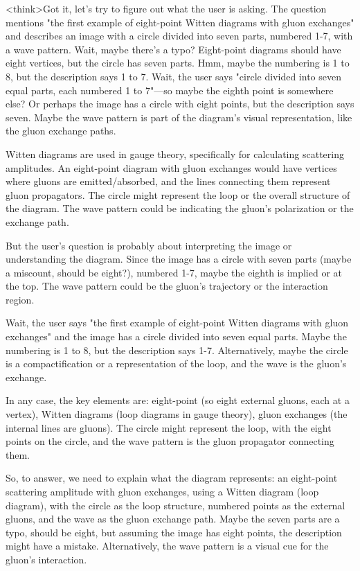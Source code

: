 <think>Got it, let's try to figure out what the user is asking. The question mentions "the first example of eight-point Witten diagrams with gluon exchanges" and describes an image with a circle divided into seven parts, numbered 1-7, with a wave pattern. Wait, maybe there's a typo? Eight-point diagrams should have eight vertices, but the circle has seven parts. Hmm, maybe the numbering is 1 to 8, but the description says 1 to 7. Wait, the user says "circle divided into seven equal parts, each numbered 1 to 7"—so maybe the eighth point is somewhere else? Or perhaps the image has a circle with eight points, but the description says seven. Maybe the wave pattern is part of the diagram's visual representation, like the gluon exchange paths.

Witten diagrams are used in gauge theory, specifically for calculating scattering amplitudes. An eight-point diagram with gluon exchanges would have vertices where gluons are emitted/absorbed, and the lines connecting them represent gluon propagators. The circle might represent the loop or the overall structure of the diagram. The wave pattern could be indicating the gluon's polarization or the exchange path.

But the user's question is probably about interpreting the image or understanding the diagram. Since the image has a circle with seven parts (maybe a miscount, should be eight?), numbered 1-7, maybe the eighth is implied or at the top. The wave pattern could be the gluon's trajectory or the interaction region. 

Wait, the user says "the first example of eight-point Witten diagrams with gluon exchanges" and the image has a circle divided into seven equal parts. Maybe the numbering is 1 to 8, but the description says 1-7. Alternatively, maybe the circle is a compactification or a representation of the loop, and the wave is the gluon's exchange. 

In any case, the key elements are: eight-point (so eight external gluons, each at a vertex), Witten diagrams (loop diagrams in gauge theory), gluon exchanges (the internal lines are gluons). The circle might represent the loop, with the eight points on the circle, and the wave pattern is the gluon propagator connecting them. 

So, to answer, we need to explain what the diagram represents: an eight-point scattering amplitude with gluon exchanges, using a Witten diagram (loop diagram), with the circle as the loop structure, numbered points as the external gluons, and the wave as the gluon exchange path. Maybe the seven parts are a typo, should be eight, but assuming the image has eight points, the description might have a mistake. Alternatively, the wave pattern is a visual cue for the gluon's interaction. 

